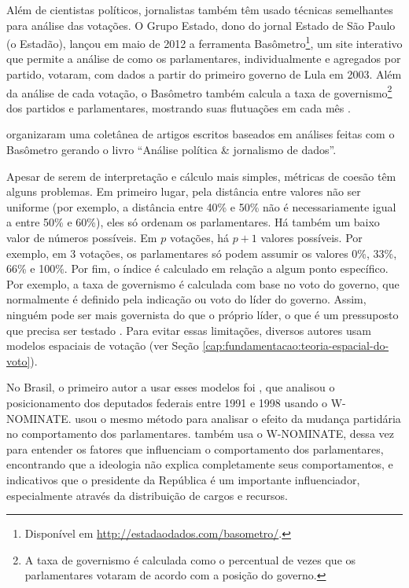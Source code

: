 Além de cientistas políticos, jornalistas também têm usado técnicas semelhantes
para análise das votações. O Grupo Estado, dono do jornal Estado de São Paulo
(o Estadão), lançou em maio de 2012 a ferramenta Basômetro\footnote{Disponível
em \url{http://estadaodados.com/basometro/}.}, um site interativo que permite a
análise de como os parlamentares, individualmente e agregados por partido,
votaram, com dados a partir do primeiro governo de Lula em 2003. Além da
análise de cada votação, o Basômetro também calcula a taxa de
governismo\footnote{A taxa de governismo é calculada como o percentual de vezes
que os parlamentares votaram de acordo com a posição do governo.} dos partidos
e parlamentares, mostrando suas flutuações em cada mês \cite{Estadao2012}.

 organizaram uma coletânea de artigos escritos baseados
em análises feitas com o Basômetro gerando o livro ``Análise política \&
jornalismo de dados''.

Apesar de serem de interpretação e cálculo mais simples, métricas de coesão têm
alguns problemas. Em primeiro lugar, pela distância entre valores não ser
uniforme (por exemplo, a distância entre 40\% e 50\% não é necessariamente
igual a entre 50\% e 60\%), eles só ordenam os parlamentares. Há também um
baixo valor de números possíveis. Em $p$ votações, há $p + 1$ valores
possíveis. Por exemplo, em 3 votações, os parlamentares só podem assumir os
valores 0\%, 33\%, 66\% e 100\%. Por fim, o índice é calculado em relação a
algum ponto específico. Por exemplo, a taxa de governismo é calculada com base
no voto do governo, que normalmente é definido pela indicação ou voto do líder
do governo. Assim, ninguém pode ser mais governista do que o próprio líder, o
que é um pressuposto que precisa ser testado
\cite{Poole2005,McCarty2011,Izumi2013}. Para evitar essas limitações, diversos
autores usam modelos espaciais de votação (ver Seção
\ref{cap:fundamentacao:teoria-espacial-do-voto}).

No Brasil, o primeiro autor a usar esses modelos foi ,
que analisou o posicionamento dos deputados federais entre 1991 e 1998 usando o
W-NOMINATE.  usou o mesmo método para analisar o
efeito da mudança partidária no comportamento dos parlamentares.
 também usa o W-NOMINATE, dessa vez para entender os
fatores que influenciam o comportamento dos parlamentares, encontrando
que a ideologia não explica completamente seus comportamentos, e indicativos
que o presidente da República é um importante influenciador, especialmente
através da distribuição de cargos e recursos.


